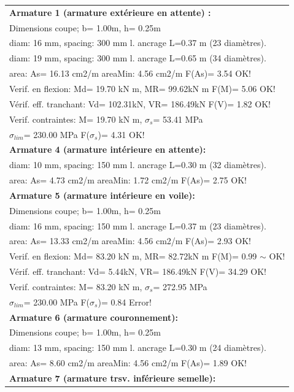 \begin{center}
\begin{supertabular}[H]{|l|}
\hline
\textbf{Armature 1 (armature extérieure en attente) :} \\
  Dimensions coupe; b= 1.00m, h= 0.25m\\
  diam: 16 mm, spacing: 300 mm  l. ancrage L=0.37 m (23 diamètres).\\
  diam: 19 mm, spacing: 300 mm  l. ancrage L=0.65 m (34 diamètres).\\
  area: As=  16.13 cm2/m areaMin:   4.56 cm2/m  F(As)= 3.54 OK!\\
  Verif. en flexion: Md=  19.70 kN m, MR=  99.62kN m  F(M)= 5.06 OK!\\
  Vérif. eff. tranchant: Vd= 102.31kN,  VR= 186.49kN  F(V)= 1.82 OK!\\
  Verif. contraintes: M=  19.70 kN m, $\sigma_s$=  53.41 MPa\\
    $\sigma_{lim}$= 230.00 MPa  F($\sigma_s$)= 4.31 OK!\\
\textbf{Armature 4 (armature intérieure en attente):}\\
  diam: 10 mm, spacing: 150 mm  l. ancrage L=0.30 m (32 diamètres).\\
  area: As=   4.73 cm2/m areaMin:   1.72 cm2/m  F(As)= 2.75 OK!\\
\textbf{Armature 5 (armature intérieure en voile):}\\
  Dimensions coupe; b= 1.00m, h= 0.25m\\
  diam: 16 mm, spacing: 150 mm  l. ancrage L=0.37 m (23 diamètres).\\
  area: As=  13.33 cm2/m areaMin:   4.56 cm2/m  F(As)= 2.93 OK!\\
  Verif. en flexion: Md=  83.20 kN m, MR=  82.72kN m  F(M)= 0.99 $\sim$ OK!\\
  Vérif. eff. tranchant: Vd=   5.44kN,  VR= 186.49kN  F(V)= 34.29 OK!\\
  Verif. contraintes: M=  83.20 kN m, $\sigma_s$= 272.95 MPa\\
    $\sigma_{lim}$= 230.00 MPa  F($\sigma_s$)= 0.84 Error!\\
\textbf{Armature 6 (armature couronnement):}\\
  Dimensions coupe; b= 1.00m, h= 0.25m\\
  diam: 13 mm, spacing: 150 mm  l. ancrage L=0.30 m (24 diamètres).\\
  area: As=   8.60 cm2/m areaMin:   4.56 cm2/m  F(As)= 1.89 OK!\\
\textbf{Armature 7 (armature trsv. inférieure semelle):}\\

\end{supertabular}
\end{center}
